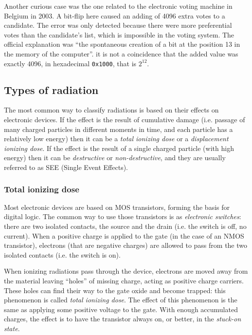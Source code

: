 Another curious case was the one related to the electronic voting machine in Belgium in 2003. A bit-flip here caused an adding of 4096 extra votes to a candidate. The error was only detected because there were more preferential votes than the candidate's list, which is impossible in the voting system. The official explanation was ``the spontaneous creation of a bit at the position 13 in the memory of the computer''. it is not a coincidence that the added value was exactly 4096, in hexadecimal \texttt{0x1000}, that is $2^{12}$.

\subsection{Types of radiation}
The most common way to classify radiations is based on their effects on electronic devices. If the effect is the result of cumulative damage (i.e. passage of many charged particles in different moments in time, and each particle has a relatively low energy) then it can be a \textit{total ionizing dose} or a \textit{displacement ionizing dose}. If the effect is the result of a single charged particle (with high energy) then it can be \textit{destructive} or \textit{non-destructive}, and they are usually referred to as SEE (Single Event Effects). \bigskip

\subsubsection{Total ionizing dose}
Most electronic devices are based on MOS transistors, forming the basis for digital logic. The common way to use those transistors is as \textit{electronic switches}: there are two isolated contacts, the source and the drain (i.e. the switch is off, no current). When a positive charge is applied to the gate (in the case of an NMOS transistor), electrons (that are negative charges) are allowed to pass from the two isolated contacts (i.e. the switch is on). \bigskip

When ionizing radiations pass through the device, electrons are moved away from the material leaving ``holes'' of missing charge, acting as positive charge carriers. These holes can find their way to the gate oxide and become trapped: this phenomenon is called \textit{total ionizing dose}. The effect of this phenomenon is the same as applying some positive voltage to the gate. With enough accumulated charges, the effect is to have the transistor always on, or better, in the \textit{stuck-on state}. \bigskip

